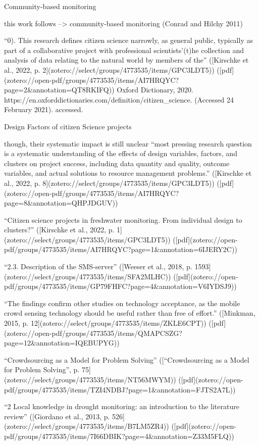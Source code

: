 {Community-based monitoring


this work follows --> community-based monitoring (Conrad and Hilchy 2011)




“0). This research defines citizen science narrowly, as general public, typically as part of a collaborative project with professional scientists’(t)he collection and analysis of data relating to the natural world by members of the” ([Kirschke et al., 2022, p. 2](zotero://select/groups/4773535/items/GPC3LDT5)) ([pdf](zotero://open-pdf/groups/4773535/items/AI7HRQYC?page=2&annotation=QT8RKIFQ))
Oxford Dictionary, 2020. https://en.oxforddictionaries.com/definition/citizen_science. (Accessed 24 February 2021). accessed.




Design Factors of citizen Science projects

though, their systematic impact is still unclear “most pressing research question is a systematic understanding of the effects of design variables, factors, and clusters on project success, including data quantity and quality, outcome variables, and actual solutions to resource management problems.” ([Kirschke et al., 2022, p. 8](zotero://select/groups/4773535/items/GPC3LDT5)) ([pdf](zotero://open-pdf/groups/4773535/items/AI7HRQYC?page=8&annotation=QHPJDGUV))

“Citizen science projects in freshwater monitoring. From individual design to clusters?” ([Kirschke et al., 2022, p. 1](zotero://select/groups/4773535/items/GPC3LDT5)) ([pdf](zotero://open-pdf/groups/4773535/items/AI7HRQYC?page=1&annotation=6IJERY2C))

“2.3. Description of the SMS-server” ([Weeser et al., 2018, p. 1593](zotero://select/groups/4773535/items/SFA2MLHC)) ([pdf](zotero://open-pdf/groups/4773535/items/GP79FHFC?page=4&annotation=V6IYDSJ9))

“The findings confirm other studies on technology acceptance, as the mobile crowd sensing technology should be useful rather than free of effort.” ([Minkman, 2015, p. 12](zotero://select/groups/4773535/items/ZKLE6CPT)) ([pdf](zotero://open-pdf/groups/4773535/items/QMAPCSZG?page=12&annotation=IQEBUPYG))


“Crowdsourcing as a Model for Problem Solving” ([“Crowdsourcing as a Model for Problem Solving”, p. 75](zotero://select/groups/4773535/items/NT56MWYM)) ([pdf](zotero://open-pdf/groups/4773535/items/TZI4NDBJ?page=1&annotation=FJTS2A7L))

“2 Local knowledge in drought monitoring: an introduction to the literature review” ([Giordano et al., 2013, p. 526](zotero://select/groups/4773535/items/B7LM5ZR4)) ([pdf](zotero://open-pdf/groups/4773535/items/7I66DBIK?page=4&annotation=Z33M5FLQ))

}

